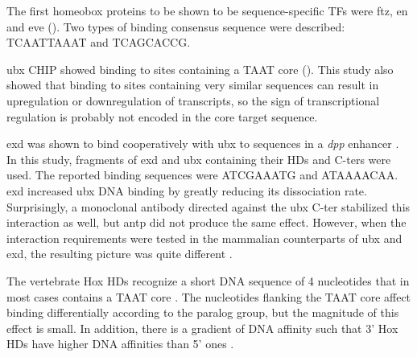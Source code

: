 The first homeobox proteins to be shown to be sequence-specific \acp{TF} were \ac{ftz}, \ac{en} and \ac{eve} (\cite{Desplan1988,Hoey1988,Hoey1988a}). Two types of binding consensus sequence were described: TCAATTAAAT and TCAGCACCG.
		
\ac{ubx} \ac{CHIP} showed binding to sites containing a TAAT core (\cite{Gould1990}). This study also showed that binding to sites containing very similar sequences can result in upregulation or downregulation of transcripts, so the sign of transcriptional regulation is probably not encoded in the core target sequence.


\ac{exd} was shown to bind cooperatively with \ac{ubx} to sequences in a \textit{dpp} enhancer \parencite{Chan1994}. In this study, fragments of \ac{exd} and \ac{ubx} containing their \acp{HD} and \acp{C-ter} were used. The reported binding sequences were ATCGAAATG and ATAAAACAA. \ac{exd} increased \ac{ubx} DNA binding by greatly reducing its dissociation rate. Surprisingly, a monoclonal antibody directed against the \ac{ubx} \ac{C-ter} stabilized this interaction as well, but \ac{antp} did not produce the same effect. However, when the interaction requirements were tested in the mammalian counterparts of \ac{ubx} and \ac{exd}, the resulting picture was quite different \parencite{Chang1995}.%

The vertebrate Hox \acp{HD} recognize a short DNA sequence of 4 nucleotides that in most cases contains a TAAT core \parencite{Treisman1992, Catron1993}. The nucleotides flanking the TAAT core affect binding differentially according to the paralog group, but the magnitude of this effect is small. In addition, there is a gradient of DNA affinity such that 3' Hox \acp{HD} have higher DNA affinities than 5' ones \parencite{Pellerin1994}. %


